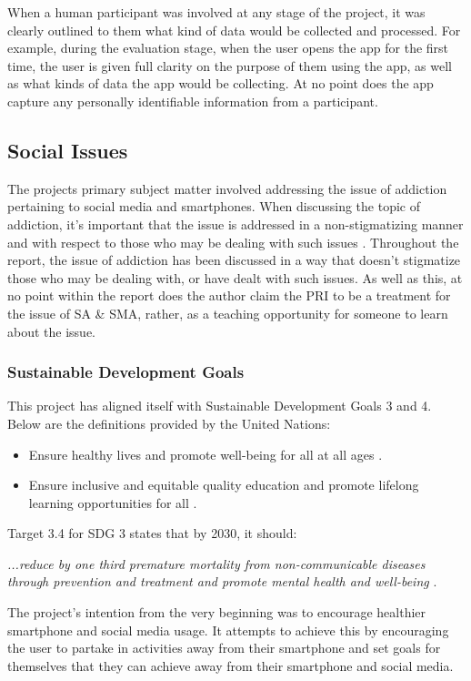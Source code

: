 \documentclass[12pt]{article}
\begin{document}
When a human participant was involved at any stage of the project, it was clearly outlined to them what kind of data would be collected and
processed. For example, during the evaluation stage, when the user opens the app for the first time, the user is given full clarity on the
purpose of them using the app, as well as what kinds of data the app would be collecting. At no point does the app capture any personally
identifiable information from a participant. 

\subsection{Social Issues}
The projects primary subject matter involved addressing the issue of addiction pertaining to social media and smartphones. When discussing
the topic of addiction, it's important that the issue is addressed in a non-stigmatizing manner and with respect to those who may be dealing
with such issues . Throughout the report, the issue of addiction has been discussed in a way that
doesn't stigmatize those who may be dealing with, or have dealt with such issues. As well as this, at no point within the report does the author 
claim the PRI to be a treatment for the issue of SA \& SMA, rather, as a teaching opportunity for someone to learn about the issue.

\subsubsection{Sustainable Development Goals}
This project has aligned itself with Sustainable Development Goals 3 and 4. Below are the definitions provided by the United Nations:

\begin{itemize}
	\item Ensure healthy lives and promote well-being for all at all ages .
	\item Ensure inclusive and equitable quality education and promote lifelong learning opportunities for all .
\end{itemize}

Target 3.4 for SDG 3 states that by 2030, it should:\newline

\textit{...reduce by one third premature mortality from non-communicable diseases through prevention and treatment and promote 
mental health and well-being} .\newline

The project's intention from the very beginning was to encourage healthier smartphone and social media usage. It attempts to achieve this by encouraging the user to partake in activities
away from their smartphone and set goals for themselves that they can achieve away from their smartphone and social media. \newline
\end{document}
